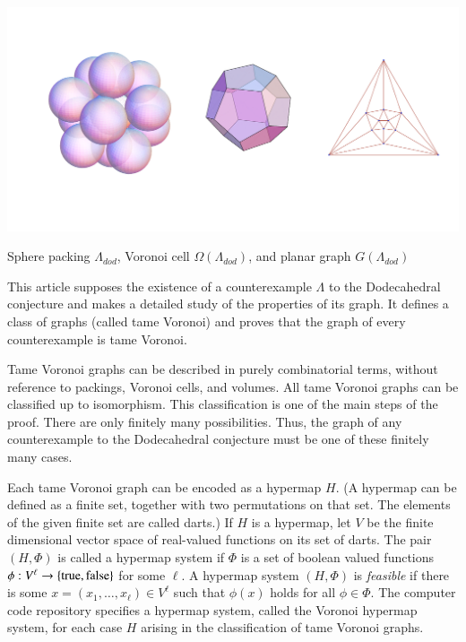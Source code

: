 \documentclass{article} %
\begin{document}
\begin{Figure}[htb]
  \begin{center}
    \includegraphics[scale=0.5]{images/graphs.pdf}
  \end{center}
  \caption{Sphere packing $\Lambda_{dod}$, Voronoi cell $\Omega(\Lambda_{dod})$, and planar graph $G(\Lambda_{dod})$}
  \label{fig:icos}
\end{Figure}

This article supposes the existence of a counterexample $\Lambda$ to
the Dodecahedral conjecture and makes a detailed study of the
properties of its graph. It defines a class of graphs (called tame
Voronoi) and proves that the graph of every counterexample is tame
Voronoi.

Tame Voronoi graphs can be described in purely combinatorial terms,
without reference to packings, Voronoi cells, and volumes. All tame
Voronoi graphs can be classified up to isomorphism. This
classification is one of the main steps of the proof. There are only
finitely many possibilities. Thus, the graph of any counterexample to
the Dodecahedral conjecture must be one of these finitely many cases.

Each tame Voronoi graph can be encoded as a hypermap $H$. (A hypermap
can be defined as a finite set, together with two permutations on that
set. The elements of the given finite set are called darts.) If $H$ is
a hypermap, let $V$ be the finite dimensional vector space of
real-valued functions on its set of darts. The pair $(H,\Phi)$ is
called a hypermap system if $\Phi$ is a set of boolean valued
functions $\phi:V^\ell \to \{{\operatorname{true}},{\operatorname{false}}\}$ for some $\ell$.
A hypermap system $(H,\Phi)$ is {\it feasible} if there is some
$x=(x_1,\ldots,x_\ell)\in V^\ell$ such that $\phi(x)$ holds for all
$\phi\in\Phi$. The computer code repository specifies 
a hypermap system, called
the Voronoi hypermap system, for each case $H$ arising in the
classification of tame Voronoi graphs.
\end{document}
